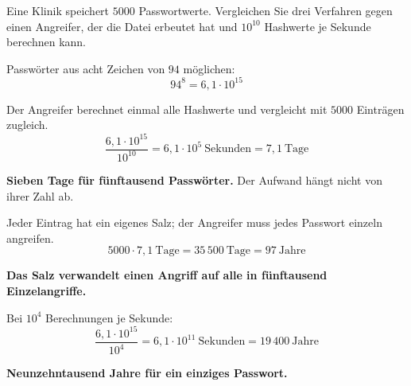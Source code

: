 \begin{aufgabe}
Eine Klinik speichert $5000$ Passwortwerte. Vergleichen Sie drei Verfahren gegen einen Angreifer, der die Datei erbeutet hat und $10^{10}$ Hashwerte je Sekunde berechnen kann.

\loesung
{}
Passwörter aus acht Zeichen von $94$ möglichen:
\[ 94^{8} = 6{,}1\cdot10^{15} \]

Der Angreifer berechnet einmal alle Hashwerte und vergleicht mit  $5000$ Einträgen zugleich.
\[ \frac{6{,}1\cdot10^{15}}{10^{10}} = 6{,}1\cdot10^{5} \ \text{Sekunden} = 7{,}1 \ \text{Tage} \]

\begin{center}
\begin{minipage}{0.9\textwidth}
\textbf{Sieben Tage für  fünftausend Passwörter.} Der Aufwand hängt nicht von ihrer Zahl ab.
\end{minipage}
\end{center}

Jeder Eintrag hat ein eigenes Salz; der Angreifer muss jedes Passwort einzeln angreifen.
\[ 5000 \cdot 7{,}1 \ \text{Tage} = 35\,500 \ \text{Tage} = 97 \ \text{Jahre} \]

\begin{center}
\begin{minipage}{0.9\textwidth}
\textbf{Das Salz verwandelt einen Angriff auf alle in fünftausend Einzelangriffe.}
\end{minipage}
\end{center}

\begin{center}
\begin{minipage}{0.86\textwidth}
\end{minipage}
\end{center}

Bei $10^{4}$ Berechnungen je Sekunde:
\[ \frac{6{,}1\cdot10^{15}}{10^{4}} = 6{,}1\cdot10^{11} \ \text{Sekunden} = 19\,400 \ \text{Jahre} \]

\begin{center}
\begin{minipage}{0.9\textwidth}
\textbf{Neunzehntausend Jahre für ein einziges Passwort.}
\end{minipage}
\end{center}


\end{aufgabe}
